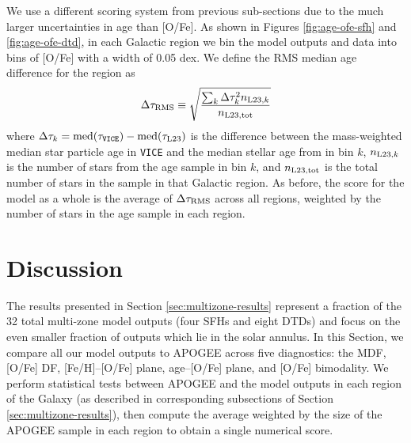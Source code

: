 \documentclass[twocolumn,twocolappendix,linenumbers,trackchanges]{aastex631}
\newcommand{\vice}{{\tt VICE}\xspace}
\begin{document}
We use a different scoring system from previous sub-sections due to the much larger uncertainties in age than [O/Fe]. As shown in Figures \ref{fig:age-ofe-sfh} and \ref{fig:age-ofe-dtd}, in each Galactic region we bin the model outputs and data into bins of [O/Fe] with a width of 0.05 dex. We define the RMS median age difference for the region as
\begin{equation}
    \Delta\tau_{\rm RMS} \equiv \sqrt{\frac{\sum_k \Delta\tau_k^2 n_{{\rm L23},k}}{n_{\rm L23,tot}}}
    \label{eq:age-ofe-score}
\end{equation}
where $\Delta\tau_k=\rm{med}(\tau_{\rm \vice})-\rm{med}(\tau_{\rm L23})$ is the difference between the mass-weighted median star particle age in \vice and the median stellar age from  in bin $k$, $n_{{\rm L23},k}$ is the number of stars from the  age sample in bin $k$, and $n_{\rm L23,tot}$ is the total number of stars in the sample in that Galactic region. As before, the score for the model as a whole is the average of $\Delta \tau_{\rm RMS}$ across all regions, weighted by the number of stars in the age sample in each region.


\section{Discussion}
\label{sec:discussion}

\vspace{-24pt}

The results presented in Section \ref{sec:multizone-results} represent a fraction of the 32 total multi-zone model outputs (four SFHs and eight DTDs) and focus on the even smaller fraction of outputs which lie in the solar annulus. 
In this Section, we compare all our model outputs to APOGEE across five diagnostics: the MDF, [O/Fe] DF, [Fe/H]--[O/Fe] plane, age--[O/Fe] plane, and [O/Fe] bimodality. We perform statistical tests between APOGEE and the model outputs in each region of the Galaxy (as described in corresponding subsections of Section \ref{sec:multizone-results}), then compute the average weighted by the size of the APOGEE sample in each region to obtain a single numerical score.
\end{document}
